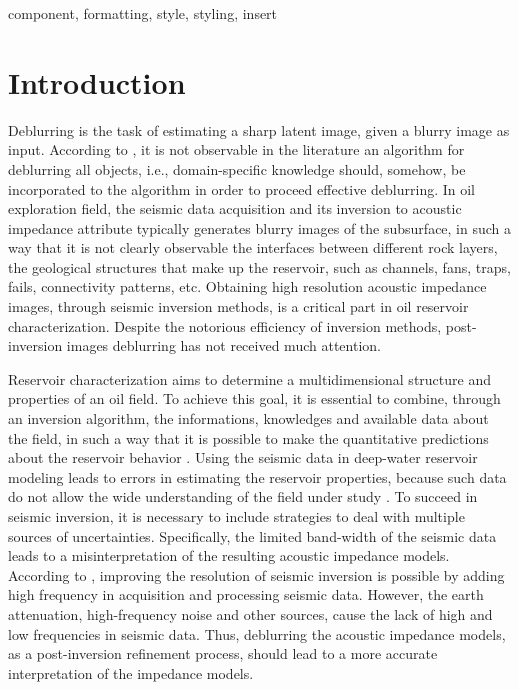 \documentclass[conference]{IEEEtran}
\begin{document}
\begin{IEEEkeywords}
component, formatting, style, styling, insert
\end{IEEEkeywords}

\section{Introduction}
Deblurring is the task of estimating a sharp latent image,
given a blurry image as input.
According to \cite{Grigorios2017}, it is not observable in the literature
an algorithm for deblurring all objects, i.e., domain-specific knowledge should,
somehow, be incorporated to the algorithm in order to proceed effective deblurring.
In oil exploration field, the seismic data acquisition and its
inversion to acoustic impedance attribute typically generates
blurry images of the subsurface, in such a way that it is not
clearly observable the interfaces between different rock layers,
the geological structures that make up the reservoir, such as channels, fans, traps, fails,
connectivity patterns, etc.
Obtaining high resolution acoustic impedance images, through seismic inversion methods,
is a critical part in oil reservoir characterization.
Despite the notorious efficiency of inversion methods,
post-inversion images deblurring has not received much attention.

Reservoir characterization aims to determine a multidimensional
structure and properties of an oil field. To achieve this goal, it is essential to combine, through an
inversion algorithm, the informations, knowledges and available data about the field,
in such a way that it is possible to make the
quantitative predictions about the reservoir behavior \cite{buiting}.
Using the seismic data in deep-water reservoir modeling leads to errors in estimating
the reservoir properties, because such data do not allow the wide understanding of the field
under study \cite{Sergio2016}.
To succeed in seismic inversion, it is necessary to include strategies to deal with multiple
sources of uncertainties. Specifically, the limited band-width of the seismic data leads to
a misinterpretation of the resulting acoustic impedance models.
According to \cite{xiaoiu}, improving the resolution of seismic inversion is
possible by adding high frequency in acquisition and processing seismic data.
However, the earth attenuation, high-frequency noise and other sources, cause
the lack of high and low frequencies in seismic data. 
Thus, deblurring the acoustic impedance models, as a post-inversion refinement process, should lead to a more accurate
interpretation of the impedance models.
\end{document}
